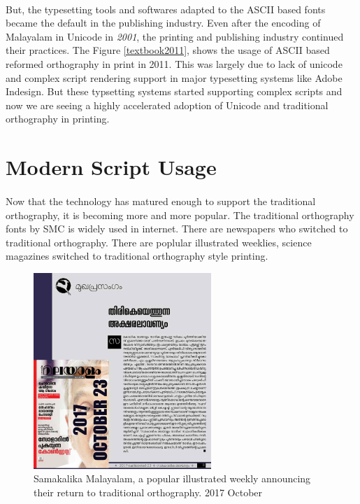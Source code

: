 \documentclass[10pt]{article}
\begin{document}
\paragraph{}
But, the typesetting tools and softwares adapted to the ASCII based fonts became the default in the publishing industry. Even after the encoding of Malayalam in Unicode in \textit{2001}, the printing and publishing industry continued their practices. The Figure \ref{textbook2011}, shows the usage of ASCII based reformed orthography in print in 2011. This was largely due to lack of unicode and complex script rendering support in major typesetting systems like Adobe Indesign. But these typsetting systems started supporting complex scripts and now we are seeing a highly accelerated adoption of Unicode and traditional orthography in printing.

\section{Modern Script Usage}
\paragraph{}
Now that the technology has matured enough to support the traditional orthography, it is becoming more and more popular. The traditional orthography fonts by SMC is widely used in internet. There are newspapers who switched to traditional orthography. There are poplular illustrated weeklies, science magazines switched to traditional orthography style printing. 

\begin{figure}[H]
	\centering
	\includegraphics[width=0.6\textwidth]{images/samakalikamalayalam.jpg}
	\caption{Samakalika Malayalam, a popular illustrated weekly announcing their return to traditional orthography. 2017 October}
\end{figure}
\end{document}
